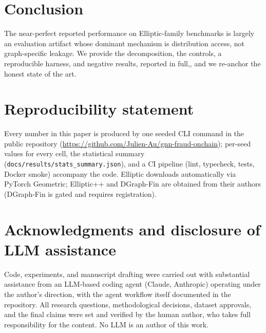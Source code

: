 \documentclass[11pt]{article}
\begin{document}
\section{Conclusion}
The near-perfect reported performance on Elliptic-family benchmarks is largely an
evaluation artifact whose dominant mechanism is distribution access, not
graph-specific leakage. We provide the decomposition, the controls, a reproducible
harness, and negative results, reported in full,, and we re-anchor the honest state of the art.

\section*{Reproducibility statement}
Every number in this paper is produced by one seeded CLI command in the public
repository (\url{https://github.com/Julien-Au/gnn-fraud-onchain}); per-seed values
for every cell, the statistical summary (\texttt{docs/results/stats\_summary.json}),
and a CI pipeline (lint, typecheck, tests, Docker smoke) accompany the code.
Elliptic downloads automatically via PyTorch Geometric; Elliptic++ and DGraph-Fin
are obtained from their authors (DGraph-Fin is gated and requires registration).

\section*{Acknowledgments and disclosure of LLM assistance}
Code, experiments, and manuscript drafting were carried out with substantial
assistance from an LLM-based coding agent (Claude, Anthropic) operating under the
author's direction, with the agent workflow itself documented in the repository.
All research questions, methodological decisions, dataset approvals, and the
final claims were set and verified by the human author, who takes full
responsibility for the content. No LLM is an author of this work.



\end{document}
